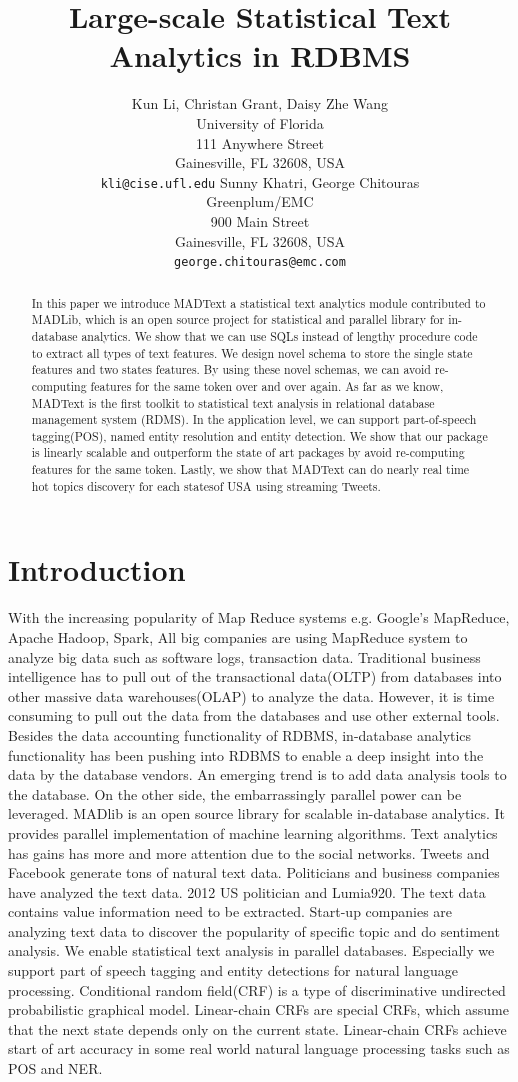\documentclass[11pt,letterpaper]{article}
\title{Large-scale Statistical Text Analytics in RDBMS\Thanks{This
    submitting for double-blind reviewing.}}
\author{Kun Li, Christan Grant, Daisy Zhe Wang\\
	    University of Florida\\
	    111 Anywhere Street\\
	    Gainesville, FL 32608, USA\\
	    {\tt kli@cise.ufl.edu}
	  \And
	Sunny Khatri, George Chitouras\\
  	Greenplum/EMC\\
  	900 Main Street\\
	    Gainesville, FL 32608, USA\\
  {\tt george.chitouras@emc.com}}
\date{}
\begin{document}
\maketitle
\begin{abstract}
In this paper we introduce MADText a statistical text analytics module contributed to MADLib, 
which is an open source project for statistical and parallel library for in-database analytics.  
We show that we can use SQLs instead of lengthy procedure code to extract all types of text features.  
We design novel schema to store the single state features and two states features.   
By using these novel schemas, we can avoid re-computing features for the same token over and over again.  
As far as we know, MADText is the first toolkit to statistical text analysis in relational database management system (RDMS).  
In the application level, we can support part-of-speech tagging(POS), named entity resolution and entity detection.  
We show that our package is linearly scalable and outperform the state of art packages by avoid re-computing features for the same token. 
Lastly, we show that MADText can do nearly real time hot topics discovery for each statesof USA using streaming Tweets.
\end{abstract}

\section{Introduction}
With the increasing popularity of Map Reduce systems e.g. Google's MapReduce, Apache Hadoop, Spark, All big companies are using 
MapReduce system to analyze big data such as software logs, transaction data. Traditional business intelligence has to 
pull out of the transactional data(OLTP) from databases into other massive data warehouses(OLAP) to analyze the data.
However, it is time consuming to pull out the data from the databases and use other external tools.
Besides the data accounting functionality of RDBMS, in-database analytics functionality has been pushing into RDBMS to 
enable a deep insight into the data by the database vendors.   An emerging trend is to add data analysis tools to the database. 
On the other side, the embarrassingly parallel power can be leveraged.
MADlib is an open source library for scalable in-database analytics. It provides parallel implementation of machine learning algorithms.
Text analytics has gains has more and more attention due to the social networks.
Tweets and Facebook generate tons of natural text data.
Politicians and business companies have analyzed the text data.
2012 US politician and Lumia920. The text data contains value information need to be extracted. Start-up companies are 
analyzing text data to discover the popularity of specific topic and do sentiment analysis. We enable statistical text analysis in 
parallel databases. Especially we support part of speech tagging and entity detections for natural language processing. Conditional random field(CRF) 
is a type of discriminative undirected probabilistic graphical model. Linear-chain CRFs are special CRFs, which assume that the next state depends only 
on the current state. Linear-chain CRFs achieve start of art accuracy in some real world natural language processing tasks such as POS and NER.
\end{document}
